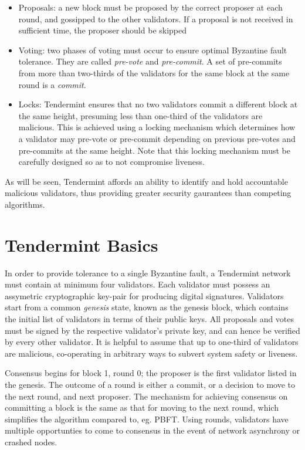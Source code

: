 \begin{itemize}

\item{Proposals: a new block must be proposed by the correct proposer at each round, and gossipped to the other validators. If a proposal is not received in sufficient time, the proposer should be skipped}

\item{Voting: two phases of voting must occur to ensure optimal Byzantine fault tolerance. They are called \emph{pre-vote} and \emph{pre-commit}. A set of pre-commits from more than two-thirds of the validators for the same block at the same round is a \emph{commit}.}

\item{Locks: Tendermint ensures that no two validators commit a different block at the same height, presuming less than one-third of the validators are malicious. This is achieved using a locking mechanism which determines how a validator may pre-vote or pre-commit depending on previous pre-votes and pre-commits at the same height. Note that this locking mechanism must be carefully designed so as to not compromise liveness.}

\end{itemize}

As will be seen, Tendermint affords an ability to identify and hold accountable malicious validators, thus providing greater security gaurantees than competing algorithms.

\section{Tendermint Basics}

In order to provide tolerance to a single Byzantine fault, a Tendermint network must contain at minimum four validators.
Each validator must possess an assymetric cryptographic key-pair for producing digital signatures.
Validators start from a common \emph{genesis} state, known as the genesis block, which contains the initial list of validators in terms of their public keys.
All proposals and votes must be signed by the respective validator's private key, and can hence be verified by every other validator.
It is helpful to assume that up to one-third of validators are malicious, co-operating in arbitrary ways to subvert system safety or liveness.

Consensus begins for block 1, round 0; the proposer is the first validator listed in the genesis.
The outcome of a round is either a commit, or a decision to move to the next round, and next proposer.
The mechanism for achieving consensus on committing a block is the same as that for moving to the next round, 
which simplifies the algorithm compared to, eg. PBFT.
Using rounds, validators have multiple opportunties to come to consensus in the event of network asynchrony or crashed nodes.

